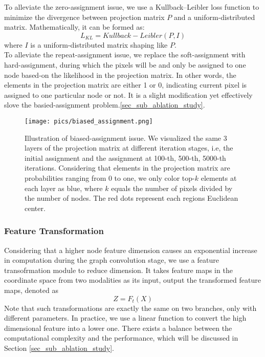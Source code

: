 \documentclass[journal]{IEEEtran}
\begin{document}
    To alleviate the zero-assignment issue, we use a Kullback–Leibler loss function to minimize the divergence between projection matrix $P$ and a uniform-distributed matrix. Mathematically, it can be formed as:
    \begin{equation}\label{loss_kl}
        L_{KL} = Kullback-Leibler(P, I)
    \end{equation}
    where $I$ is a uniform-distributed matrix shaping like $P$. \\
    
    To alleviate the repeat-assignment issue, we replace the soft-assignment with hard-assignment, during which the pixels will be and only be assigned to one node based-on the likelihood in the projection matrix. In other words, the elements in the projection matrix are either 1 or 0, indicating current pixel is assigned to one particular node or not. It is a slight modification yet effectively slove the basied-assignment problem.\ref{sec_sub_ablation_study}. \\   
    
    
    \begin{figure}
        \centering
        \texttt{[image: pics/biased\_assignment.png]}
        \caption{Illustration of biased-assignment issue. We visualized the same 3 layers of the projection matrix at different iteration stages, i.e, the initial assignment and the assignment at 100-th, 500-th, 5000-th iterations. Considering that elements in the projection matrix are probabilities ranging from 0 to one, we only color top-$k$ elements at each layer as blue, where $k$ equals the number of pixels divided by the number of nodes. The red dots represent each regions Euclidean center.}
        \label{fig_biased_assignment}
    \end{figure} 
    

\subsubsection{Feature Transformation} \label{sec_sub_feature_transofrm}
    Considering that a higher node feature dimension causes an exponential increase in computation during the graph convolution stage, we use a feature transofrmation module to reduce dimension. It takes feature maps in the coordinate space from two modalities as its input, output the transformed feature maps, denoted as
    \begin{equation}
     Z = F_t(X)
    \end{equation}
    Note that such transformations are exactly the same on two branches, only with different parameters. In practice, we use a linear function to convert the high dimensional feature into a lower one. There exists a balance between the computational complexity and the performance, which will be discussed in Section \ref{sec_sub_ablation_study}. \\   
\end{document}
